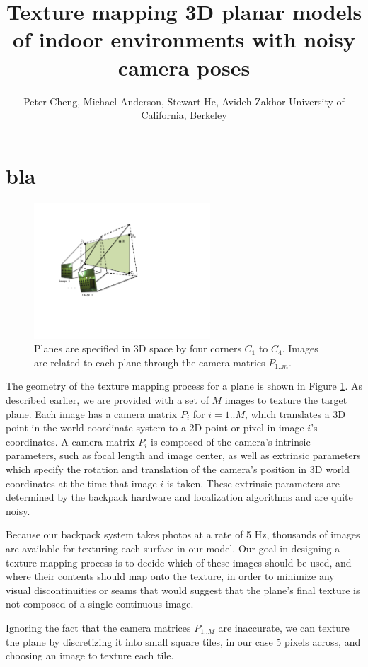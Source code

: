 \documentclass[]{spie}  %
\title{Texture mapping 3D planar models of indoor environments with noisy camera poses}
\author{Peter Cheng, Michael Anderson, Stewart He, Avideh Zakhor
\skiplinehalf
University of California, Berkeley\\
}
\begin{document}
\section{bla}

\label{sec:simpleTextureMapping}
\begin{figure}
  \centering
  \includegraphics[height=2in]{Projection.pdf}
  \caption{Planes are specified in 3D space by four corners $C_1$ to
    $C_4$. Images are related to each plane through the camera matrics
    $P_{1..m}$. }
  \label{fig:projection}
\end{figure}

The geometry of the texture mapping process for a plane is shown in
Figure \ref{fig:projection}.  As described earlier, we are provided
with a set of $M$ images to texture the target plane. Each image has a
camera matrix $P_i$ for $i=1..M$, which translates a 3D point in the
world coordinate system to a 2D point or pixel in image $i$'s
coordinates. A camera matrix $P_i$ is composed of the camera's
intrinsic parameters, such as focal length and image center, as well
as extrinsic parameters which specify the rotation and translation of
the camera's position in 3D world coordinates at the time that image
$i$ is taken. These extrinsic parameters are determined by the
backpack hardware and localization algorithms \cite{chen2010indoor,
  liu2010indoor, kua2012loopclosure} and are quite noisy.

Because our backpack system takes photos at a rate of 5 Hz, thousands
of images are available for texturing each surface in our model. Our
goal in designing a texture mapping process is to decide which of
these images should be used, and where their contents should map onto
the texture, in order to minimize any visual discontinuities or seams
that would suggest that the plane's final texture is not composed of a
single continuous image.

Ignoring the fact that the camera matrices $P_{1..M}$ are inaccurate,
we can texture the plane by discretizing it into small square tiles,
in our case 5 pixels across, and choosing an image to texture each
tile.
\end{document}
